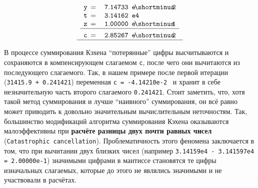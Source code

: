 \documentclass{article}
\theoremstyle{definition}
\begin{document}
\begin{multicols}{2}
\begin{equation*}
\begin{array}{l}
\begin{array}{l l l}
\mathtt{y} \!\!\!\!\!\!\!& \mathtt{=\, \phantom{-}7.14733} & \!\!\!\mathtt{e\!\shortminus\!\!2} \\
\mathtt{t} \!\!\!\!\!\!\!& \mathtt{=\, \phantom{-}3.14162} & \!\!\!\mathtt{e4} \\
\mathtt{z} \!\!\!\!\!\!\!& \mathtt{=\, \phantom{-}1.00000} & \!\!\!\mathtt{e\!\shortminus\!\!1} \\ \hline\\[-8pt]
\mathtt{c} \!\!\!\!\!\!\!& \mathtt{=\, \phantom{-}2.85267} & \!\!\!\mathtt{e\!\shortminus\!\!2}
\end{array} \\[8pt] \hline
\end{array}
\end{equation*}
\end{multicols} \vspace{-0.5cm}\noindent
В процессе суммирования Кэхена ``потерянные'' цифры высчитываются и сохраняются в компенсирующем слагаемом \verb_c_, после чего они вычитаются из последующего слагаемого. Так, в нашем примере после первой итерации (\verb_31415.9 + 0.241421_) переменная \verb_c = -4.14210e-2_ \, и хранит в себе незначительную часть второго слагаемого \verb_0.241421_. Стоит заметить, что, хотя такой метод суммирования и лучше ``наивного'' суммирования, он всё равно может приводить к довольно значительным вычислительным неточностям.
Так, большинство модификаций алгоритма суммирования Кэхена оказываются малоэффективны при \textbf{расчёте разницы двух почти равных чисел} (\verb_Catastrophic cancellation_). Проблематичность этого феномена заключается в том, что при вычитании двух близких чисел (например \verb_3.14159e4 - 3.141597e4 = 2.00000e-1_) значимыми цифрами в мантиссе становятся те цифры изначальных слагаемых, которые до этого не являлись значимыми и не участвовали в расчётах.
\end{document}
